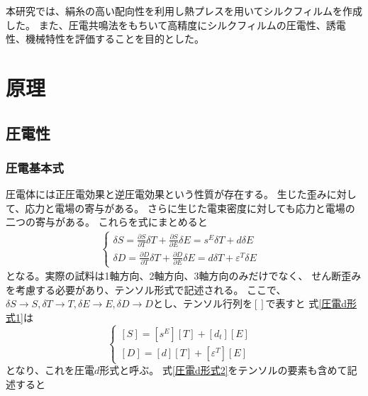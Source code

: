 \documentclass[dvipdfmx,12pt,a4paper]{jreport}
\begin{document}
		本研究では、絹糸の高い配向性を利用し熱プレスを用いてシルクフィルムを作成した。
		また、圧電共鳴法をもちいて高精度にシルクフィルムの圧電性、誘電性、機械特性を評価することを目的とした。
	\chapter{原理}
		\section{圧電性}
		\subsection{圧電基本式}
		圧電体には正圧電効果と逆圧電効果という性質が存在する。
		生じた歪みに対して、応力と電場の寄与がある。
		さらに生じた電束密度に対しても応力と電場の二つの寄与がある。
		これらを式にまとめると
				\begin{eqnarray}
					\begin{cases}
						\delta S=\frac{\partial S}{\partial T}\delta T + \frac{\partial S}{\partial E} \delta E 
						= s^{E}\delta T+d \delta E & \\
						\delta D=\frac{\partial D}{\partial T}\delta T + \frac{\partial D}{\partial E}\delta E 
						= d \delta T+\varepsilon^T \delta E  &
					\end{cases}
					\label{圧電d形式1}
				\end{eqnarray}
			となる。実際の試料は1軸方向、2軸方向、3軸方向のみだけでなく、
			せん断歪みを考慮する必要があり、テンソル形式で記述される。
			ここで、$\delta S\rightarrow S, \delta T\rightarrow T,
			\delta E\rightarrow E, \delta D\rightarrow D$とし、テンソル行列を$\left[　\right]$で表すと
			式\eqref{圧電d形式1}は
			\begin{equation}
				\begin{cases}
					\left[S\right]=\left[s^E\right]\left[T\right]+\left[d_t\right]\left[E\right]& \\
					\left[D\right]=\left[d\right]\left[T\right]+\left[\varepsilon^T\right]\left[E\right]
				\end{cases}
				\label{圧電d形式2}
			\end{equation}
			となり、これを圧電$d$形式と呼ぶ。
			式\eqref{圧電d形式2}をテンソルの要素も含めて記述すると
\end{document}
